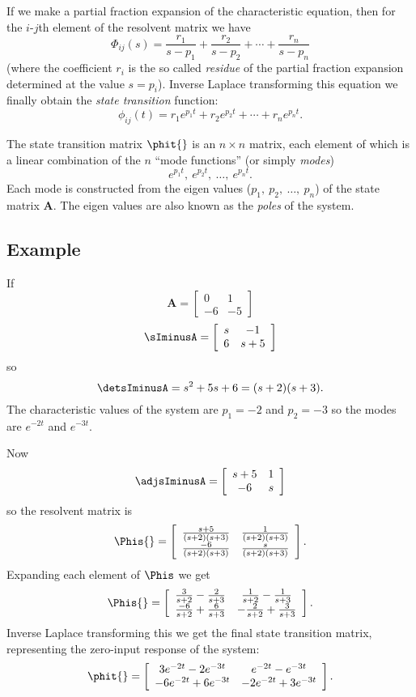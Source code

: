 \begin{slide}\label{slide:l4slide4}
 If we make a partial fraction
expansion of the characteristic equation, then for the $i$-$j$th
element of the resolvent matrix we have
\[\Phi_{ij}(s)=\frac{r_1}{s-p_1}+\frac{r_2}{s-p_2} + \cdots +
\frac{r_n}{s-p_n}\](where the coefficient $r_i$ is the so called
\emph{residue} of the partial fraction expansion determined at the
value $s=p_i$). Inverse Laplace transforming this equation we
finally obtain the \emph{state transition} function:
\[\phi_{ij}(t) = r_1 e^{p_1 t} + r_2 e^{p_2 t} + \cdots + r_n
e^{p_n t}.\]
\end{slide}
\begin{slide}\label{slide:l4slide5}
 The state transition matrix $\phit{}$
is an $n\times n$ matrix, each element of which is a linear
combination of the $n$ ``mode functions'' (or simply \emph{modes})
\[e^{p_1 t},\ e^{p_2 t},\ \ldots,\ e^{p_n t}.\] Each mode is constructed from the
eigen values ($p_1,\ p_2,\ \ldots,\ p_n$) of the state matrix
$\mathbf{A}$. The eigen values are also known as the \emph{poles}
of the system.
\end{slide}
\subsection*{Example}
If \[\mathbf{A} = \left[\begin{array}{cc}
  0 & 1 \\
  -6 & -5
\end{array}\right]\] \[\sIminusA = \left[\begin{array}{cc}
  s & -1 \\
  6 & s+5
\end{array}\right]\] so \[\detsIminusA = s^2 + 5s + 6 = (s+2)(s+3).\]
The characteristic values of the system are $p_1=-2$ and $p_2=-3$
so the modes are $e^{-2t}$ and $e^{-3t}$.

Now \[\adjsIminusA = \left[\begin{array}{cc}
  s+5 & 1 \\
  -6 & s
\end{array}\right]\] so the resolvent matrix is \[\Phis{} = \left[\begin{array}{cc}
  \frac{s+5}{(s+2)(s+3)} & \frac{1}{(s+2)(s+3)} \\
  \frac{-6}{(s+2)(s+3)} & \frac{s}{(s+2)(s+3)}
\end{array}\right].\] Expanding each element of $\Phis$ we get
\[\Phis{} = \left[\begin{array}{cc}
  \frac{3}{s+2}-\frac{2}{s+3} & \frac{1}{s+2}-\frac{1}{s+3} \\
  \frac{-6}{s+2}+\frac{6}{s+3} & -\frac{2}{s+2}+\frac{3}{s+3}
\end{array}\right].\] Inverse Laplace transforming this we get the final state
transition matrix, representing the zero-input response of the
system: \[\phit{}=\left[\begin{array}{cc}
  3e^{-2t}-2e^{-3t} & e^{-2t}-e^{-3t} \\
 -6e^{-2t}+6e^{-3t} & -2e^{-2t}+3e^{-3t}
\end{array}\right].\]

